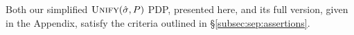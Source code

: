 
\begin{figure}
\vspace*{-1cm}
\end{figure}



 Both our simplified $\textsc{Unify}(\hat{\sigma}, P)$ PDP, presented here, and its full version, given in the Appendix, satisfy the criteria outlined in \S\ref{subsec:sep:assertions}. 


